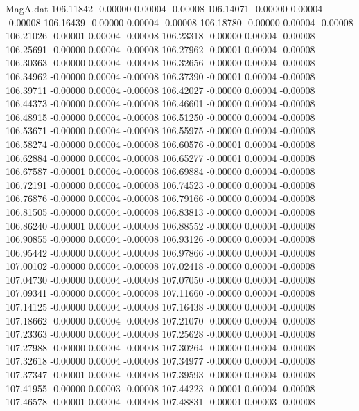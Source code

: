 \begin{filecontents}{MagA.dat}
 106.11842   -0.00000    0.00004   -0.00008
 106.14071   -0.00000    0.00004   -0.00008
 106.16439   -0.00000    0.00004   -0.00008
 106.18780   -0.00000    0.00004   -0.00008
 106.21026   -0.00001    0.00004   -0.00008
 106.23318   -0.00000    0.00004   -0.00008
 106.25691   -0.00000    0.00004   -0.00008
 106.27962   -0.00001    0.00004   -0.00008
 106.30363   -0.00000    0.00004   -0.00008
 106.32656   -0.00000    0.00004   -0.00008
 106.34962   -0.00000    0.00004   -0.00008
 106.37390   -0.00001    0.00004   -0.00008
 106.39711   -0.00000    0.00004   -0.00008
 106.42027   -0.00000    0.00004   -0.00008
 106.44373   -0.00000    0.00004   -0.00008
 106.46601   -0.00000    0.00004   -0.00008
 106.48915   -0.00000    0.00004   -0.00008
 106.51250   -0.00000    0.00004   -0.00008
 106.53671   -0.00000    0.00004   -0.00008
 106.55975   -0.00000    0.00004   -0.00008
 106.58274   -0.00000    0.00004   -0.00008
 106.60576   -0.00001    0.00004   -0.00008
 106.62884   -0.00000    0.00004   -0.00008
 106.65277   -0.00001    0.00004   -0.00008
 106.67587   -0.00001    0.00004   -0.00008
 106.69884   -0.00000    0.00004   -0.00008
 106.72191   -0.00000    0.00004   -0.00008
 106.74523   -0.00000    0.00004   -0.00008
 106.76876   -0.00000    0.00004   -0.00008
 106.79166   -0.00000    0.00004   -0.00008
 106.81505   -0.00000    0.00004   -0.00008
 106.83813   -0.00000    0.00004   -0.00008
 106.86240   -0.00001    0.00004   -0.00008
 106.88552   -0.00000    0.00004   -0.00008
 106.90855   -0.00000    0.00004   -0.00008
 106.93126   -0.00000    0.00004   -0.00008
 106.95442   -0.00000    0.00004   -0.00008
 106.97866   -0.00000    0.00004   -0.00008
 107.00102   -0.00000    0.00004   -0.00008
 107.02418   -0.00000    0.00004   -0.00008
 107.04730   -0.00000    0.00004   -0.00008
 107.07050   -0.00000    0.00004   -0.00008
 107.09341   -0.00000    0.00004   -0.00008
 107.11660   -0.00000    0.00004   -0.00008
 107.14125   -0.00000    0.00004   -0.00008
 107.16438   -0.00000    0.00004   -0.00008
 107.18662   -0.00000    0.00004   -0.00008
 107.21070   -0.00000    0.00004   -0.00008
 107.23363   -0.00000    0.00004   -0.00008
 107.25628   -0.00000    0.00004   -0.00008
 107.27988   -0.00000    0.00004   -0.00008
 107.30264   -0.00000    0.00004   -0.00008
 107.32618   -0.00000    0.00004   -0.00008
 107.34977   -0.00000    0.00004   -0.00008
 107.37347   -0.00001    0.00004   -0.00008
 107.39593   -0.00000    0.00004   -0.00008
 107.41955   -0.00000    0.00003   -0.00008
 107.44223   -0.00001    0.00004   -0.00008
 107.46578   -0.00001    0.00004   -0.00008
 107.48831   -0.00001    0.00003   -0.00008

\end{filecontents}
